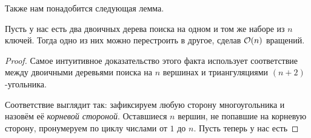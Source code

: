 Также нам понадобится следующая лемма.

\begin{lemma}\label{tree_distance} Пусть у нас есть два двоичных дерева поиска на одном и том же наборе из $n$ ключей. Тогда одно из них можно перестроить в другое, сделав $\mathcal{O}(n)$ вращений.
\end{lemma}
\begin{proof} Самое интуитивное доказательство этого факта использует соответствие
	между двоичными деревьями поиска на $n$ вершинах и триангуляциями $(n + 2)$-угольника.

	Соответствие выглядит так: зафиксируем любую сторону многоугольника и назовём её \emph{корневой стороной}. Оставшиеся $n$ вершин, не попавшие на корневую сторону,
	пронумеруем по циклу числами от $1$ до $n$. Пусть теперь у нас есть

\end{proof}

